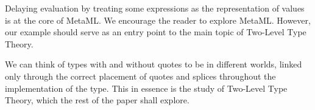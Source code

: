 Delaying evaluation by treating some expressions as the representation of values is at the core of MetaML. We encourage the reader to explore MetaML. However, our example should serve as an entry point to the main topic of Two-Level Type Theory. 

We can think of types with and without quotes to be in different worlds, linked only through the correct placement of quotes and splices throughout the implementation of the type. This in essence is the study of Two-Level Type Theory, which the rest of the paper shall explore.


